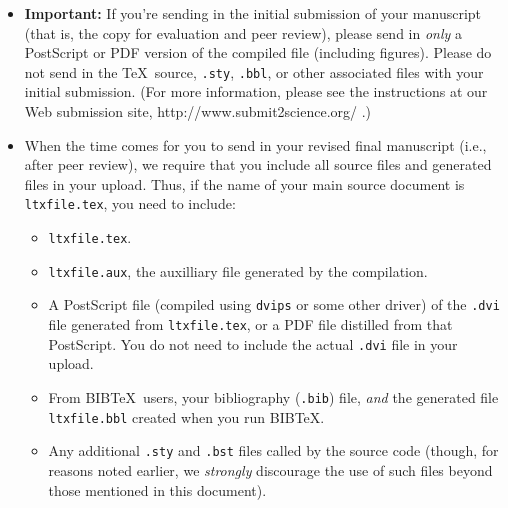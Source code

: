 \documentclass[12pt]{article}
\begin{document}
\begin{itemize}
\item {\bf Important:} If you're sending in the initial submission of
  your manuscript (that is, the copy for evaluation and peer review),
  please send in {\it only\/} a PostScript or PDF version of the
  compiled file (including figures).  Please do not send in the \TeX\ 
  source, \texttt{.sty}, \texttt{.bbl}, or other associated files with
  your initial submission.  (For more information, please see the
  instructions at our Web submission site,
  http://www.submit2science.org/ .)
\item When the time comes for you to send in your revised final
  manuscript (i.e., after peer review), we require that you include
  all source files and generated files in your upload.  Thus, if the
  name of your main source document is \texttt{ltxfile.tex}, you
  need to include:
\begin{itemize}
\item \texttt{ltxfile.tex}.
\item \texttt{ltxfile.aux}, the auxilliary file generated by the
  compilation.
\item A PostScript file (compiled using \texttt{dvips} or some other
  driver) of the \texttt{.dvi} file generated from
  \texttt{ltxfile.tex}, or a PDF file distilled from that
  PostScript.  You do not need to include the actual \texttt{.dvi}
  file in your upload.
\item From B{\small{IB}}\TeX\ users, your bibliography (\texttt{.bib})
  file, {\it and\/} the generated file \texttt{ltxfile.bbl} created
  when you run B{\small{IB}}\TeX.
\item Any additional \texttt{.sty} and \texttt{.bst} files called by
  the source code (though, for reasons noted earlier, we {\it
    strongly\/} discourage the use of such files beyond those
  mentioned in this document).
\end{itemize}
\end{itemize}








\end{document}
